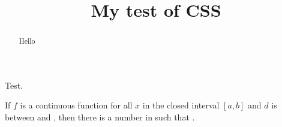 \documentclass{ximera}
\title{My test of CSS}
\begin{document}
\begin{abstract}
Hello  
\end{abstract}
\maketitle

\begin{theorem}
  Test.
\end{theorem}

\begin{theorem}
If $f$ is a continuous function for all $x$ in the closed interval
$[a,b]$ and $d$ is between
 and
, then there is a
number  in
   such that
  .
\end{theorem}
\end{document}
